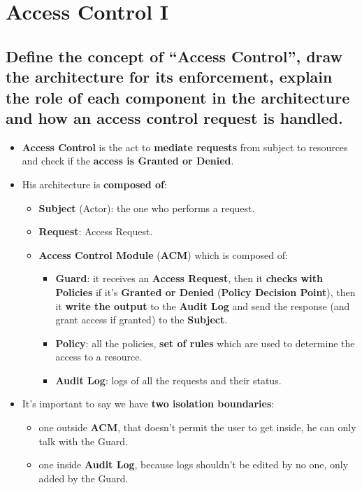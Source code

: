 \documentclass[9pt, letterpaper]{article}
\begin{document}
\newpage

\section{Access Control I}

\subsection{Define the concept of “Access Control”, draw the architecture for its enforcement, explain the role of each component in the architecture and how an access control request is handled.}
\begin{itemize}
	\item \textbf{Access Control} is the act to \textbf{mediate requests} from subject to resources and check if the \textbf{access is Granted or Denied}.
	\item His architecture is \textbf{composed of}:
	      \begin{itemize}
		      \item \textbf{Subject} (Actor): the one who performs a request.
		      \item \textbf{Request}: Access Request.
		      \item \textbf{Access Control Module} (\textbf{ACM}) which is composed of:
		            \begin{itemize}
			            \item \textbf{Guard}: it receives an \textbf{Access Request}, then it \textbf{checks with Policies} if it's \textbf{Granted or Denied} (\textbf{Policy Decision Point}), then it \textbf{write the output} to the \textbf{Audit Log} and send the response (and grant access if granted) to the \textbf{Subject}.
			            \item \textbf{Policy}: all the policies, \textbf{set of rules} which are used to determine the access to a resource.
			            \item \textbf{Audit Log}: logs of all the requests and their status.
		            \end{itemize}
	      \end{itemize}
	\item It's important to say we have \textbf{two isolation boundaries}:
	      \begin{itemize}
		      \item one outside \textbf{ACM}, that doesn't permit the user to get inside, he can only talk with the Guard.
		      \item one inside \textbf{Audit Log}, because logs shouldn't be edited by no one, only added by the Guard.

\end{itemize}
\end{itemize}
\end{document}
